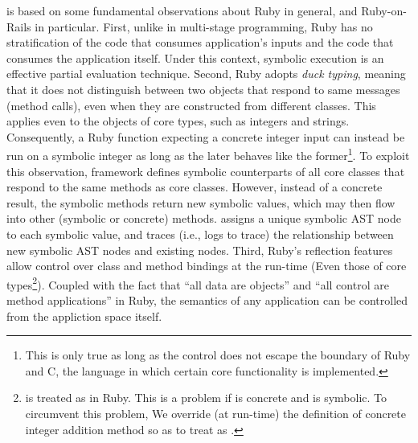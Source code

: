 \name is based on some fundamental observations about Ruby in general,
and Ruby-on-Rails in particular. First, unlike in multi-stage
programming, Ruby has no stratification of the code that consumes
application's inputs and the code that consumes the application
itself. Under this context, symbolic execution is an effective partial
evaluation technique. Second, Ruby adopts \emph{duck typing}, meaning
that it does not distinguish between two objects that respond to same
messages (method calls), even when they are constructed from different
classes. This applies even to the objects of core types, such as
integers and strings. Consequently, a Ruby function expecting a
concrete integer input can instead be run on a symbolic integer as
long as the later behaves like the former\footnote{This is only true
as long as the control does not escape the boundary of Ruby and C, the
language in which certain core functionality is implemented.}. To
exploit this observation, \name framework defines symbolic
counterparts of all core classes that respond to the same methods as
core classes. However, instead of a concrete result, the symbolic
methods return new symbolic values, which may then flow into other
(symbolic or concrete) methods. \name assigns a unique symbolic AST
node to each symbolic value, and traces (i.e., logs to trace) the
relationship between new symbolic AST nodes and existing nodes. Third,
Ruby's reflection features allow control over class and method
bindings at the run-time (Even those of core types\footnote{ is
treated as  in Ruby. This is a problem if  is concrete
and  is symbolic. To circumvent this problem, We override (at
run-time) the definition of concrete integer addition method so as to
treat  as .}). Coupled with the fact that ``all data are
objects'' and ``all control are method applications'' in Ruby, the
semantics of any application can be controlled from the appliction
space itself. 

